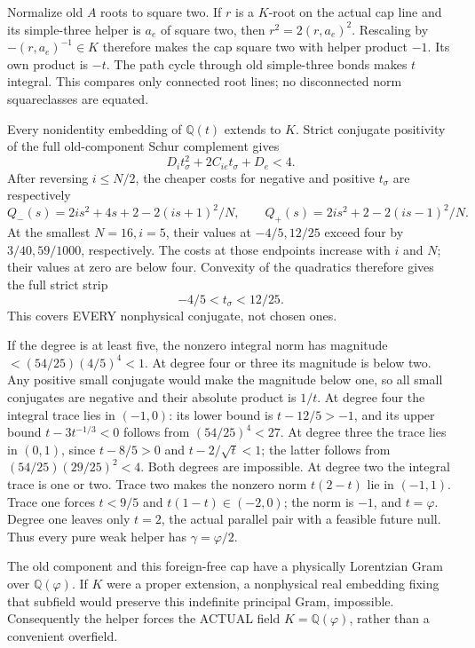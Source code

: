 \documentclass[11pt]{article}
\begin{document}
Normalize old \(A\) roots to square two.
If \(r\) is a \(K\)-root on the actual cap line and its simple-three
helper is \(a_e\) of square two, then
\(r^2=2(r,a_e)^2\).  Rescaling by \(-(r,a_e)^{-1}\in K\)
therefore makes the cap square two with helper product \(-1\).
Its own product is \(-t\).
The path cycle through old simple-three bonds makes \(t\) integral.
This compares only connected root lines; no disconnected norm
squareclasses are equated.

Every nonidentity embedding of \(\mathbb Q(t)\) extends to \(K\).
Strict conjugate positivity of the full old-component Schur
complement gives
\[
                    D_it_\sigma^2+2C_{ie}t_\sigma+D_e<4 .
\]
After reversing \(i\le N/2\), the cheaper costs for negative and
positive \(t_\sigma\) are respectively
\[
 Q_-(s)=2is^2+4s+2-2(is+1)^2/N,\qquad
 Q_+(s)=2is^2+2-2(is-1)^2/N .
\]
At the smallest \(N=16,i=5\), their values at \(-4/5,12/25\)
exceed four by \(3/40,59/1000\), respectively.
The costs at those endpoints increase with \(i\) and \(N\);
their values at zero are below four.
Convexity of the quadratics therefore gives the full strict strip
\[
                         -4/5<t_\sigma<12/25 .
\tag{Agoldenstrip}\label{eq:arithAgoldenstrip}
\]
This covers EVERY nonphysical conjugate, not chosen ones.

If the degree is at least five, the nonzero integral norm has
magnitude \(<(54/25)(4/5)^4<1\).
At degree four or three its magnitude is below two.
Any positive small conjugate would make the magnitude below one,
so all small conjugates are negative and their absolute product
is \(1/t\).
At degree four the integral trace lies in \((-1,0)\):
its lower bound is \(t-12/5>-1\), and its upper bound
\(t-3t^{-1/3}<0\) follows from \((54/25)^4<27\).
At degree three the trace lies in \((0,1)\), since
\(t-8/5>0\) and \(t-2/\sqrt t<1\);
the latter follows from
\((54/25)(29/25)^2<4\).
Both degrees are impossible.
At degree two the integral trace is one or two.
Trace two makes the nonzero norm \(t(2-t)\) lie in \((-1,1)\).
Trace one forces \(t<9/5\) and \(t(1-t)\in(-2,0)\);
the norm is \(-1\), and \(t=\varphi\).
Degree one leaves only \(t=2\), the actual parallel pair with
a feasible future null.
Thus every pure weak helper has \(\gamma=\varphi/2\).

The old component and this foreign-free cap have a physically
Lorentzian Gram over \(\mathbb Q(\varphi)\).
If \(K\) were a proper extension, a nonphysical real embedding
fixing that subfield would preserve this indefinite principal
Gram, impossible.
Consequently the helper forces the ACTUAL field
\(K=\mathbb Q(\varphi)\), rather than a convenient overfield.
\end{document}
